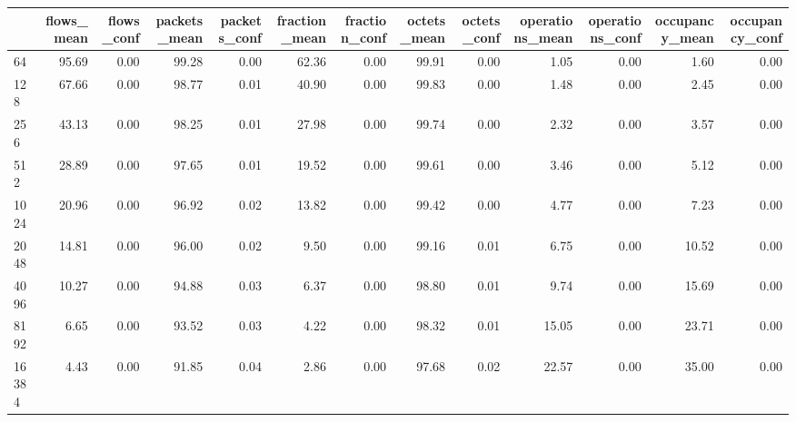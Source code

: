 \begin{tabular}{lrrrrrrrrrrrr}
\toprule
{} &  flows\_mean &  flows\_conf &  packets\_mean &  packets\_conf &  fraction\_mean &  fraction\_conf &  octets\_mean &  octets\_conf &  operations\_mean &  operations\_conf &  occupancy\_mean &  occupancy\_conf \\
\midrule
64         &       95.69 &        0.00 &         99.28 &          0.00 &          62.36 &           0.00 &        99.91 &         0.00 &             1.05 &             0.00 &            1.60 &            0.00 \\
128        &       67.66 &        0.00 &         98.77 &          0.01 &          40.90 &           0.00 &        99.83 &         0.00 &             1.48 &             0.00 &            2.45 &            0.00 \\
256        &       43.13 &        0.00 &         98.25 &          0.01 &          27.98 &           0.00 &        99.74 &         0.00 &             2.32 &             0.00 &            3.57 &            0.00 \\
512        &       28.89 &        0.00 &         97.65 &          0.01 &          19.52 &           0.00 &        99.61 &         0.00 &             3.46 &             0.00 &            5.12 &            0.00 \\
1024       &       20.96 &        0.00 &         96.92 &          0.02 &          13.82 &           0.00 &        99.42 &         0.00 &             4.77 &             0.00 &            7.23 &            0.00 \\
2048       &       14.81 &        0.00 &         96.00 &          0.02 &           9.50 &           0.00 &        99.16 &         0.01 &             6.75 &             0.00 &           10.52 &            0.00 \\
4096       &       10.27 &        0.00 &         94.88 &          0.03 &           6.37 &           0.00 &        98.80 &         0.01 &             9.74 &             0.00 &           15.69 &            0.00 \\
8192       &        6.65 &        0.00 &         93.52 &          0.03 &           4.22 &           0.00 &        98.32 &         0.01 &            15.05 &             0.00 &           23.71 &            0.00 \\
16384      &        4.43 &        0.00 &         91.85 &          0.04 &           2.86 &           0.00 &        97.68 &         0.02 &            22.57 &             0.00 &           35.00 &            0.00 \\

\end{tabular}
